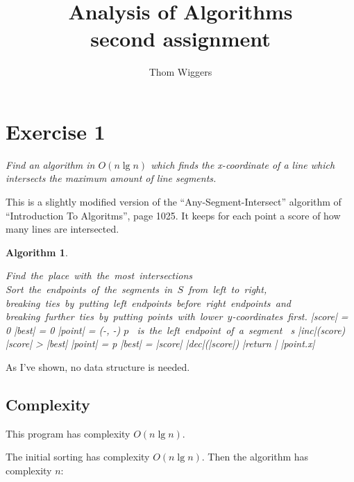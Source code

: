 \documentclass{article}
\author{Thom Wiggers}
\title{Analysis of Algorithms\\{\large second assignment} }
\newtheorem{algorithm}{Algorithm}[section]
\begin{document}
\maketitle

\section{Exercise 1}

\emph{Find an algorithm in $O(n \lg n)$ which finds the x-coordinate of
a line which intersects the maximum amount of line segments.}

This is a slightly modified version of the ``Any-Segment-Intersect''
algorithm of ``Introduction To Algoritms'', page 1025. It keeps for 
each point a score of how many lines are intersected.
\begin{algorithm}
\begin{program}
  \mbox{Find the place with the most intersections}
  \label{one}
  \BEGIN \\
    \mbox{Sort the endpoints of the segments in $S$ from left to right,}
    \quad\mbox{breaking ties by putting left endpoints before right%
      endpoints and}
    \quad\mbox{breaking further ties by putting points with lower %
      $y$-coordinates first.}
    |score| = 0  \label{ass1}
    |best| = 0   \label{ass2}
    |point| = (-\infty, -\infty)   \label{ass3}
     \label{forb}
      \IF $p$ \mbox{ is the left endpoint of a segment } s \label{if1}
        \THEN 
          |inc|(score) 
          \IF |score| > |best| \label{if2}
            \THEN 
              |point| = p
              |best| = |score|
          \FI
        \ELSE
          |dec|(|score|) 
      \FI
    \END \label{forend}
    |return | |point.x|
  \END
\end{program}
\end{algorithm}

As I've shown, no data structure is needed.

\subsection{Complexity}
This program has complexity $O(n \lg n)$.

The initial sorting has complexity $O(n \lg n)$. Then the algorithm has
complexity $n$:
\end{document}
